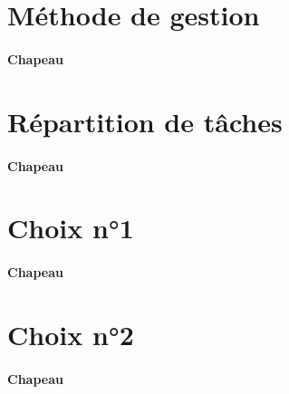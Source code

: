 \section{Méthode de gestion}
\label{sec:gestion_de_projet_methode_de_gestion}

\paragraph{Chapeau}


\section{Répartition de tâches}
\label{sec:gestion_de_projet_repartition_de_taches}

\paragraph{Chapeau}


\section{Choix n°1}
\label{sec:gestion_de_projet_choix_1}

\paragraph{Chapeau}


\section{Choix n°2}
\label{sec:gestion_de_projet_choix_2}

\paragraph{Chapeau}